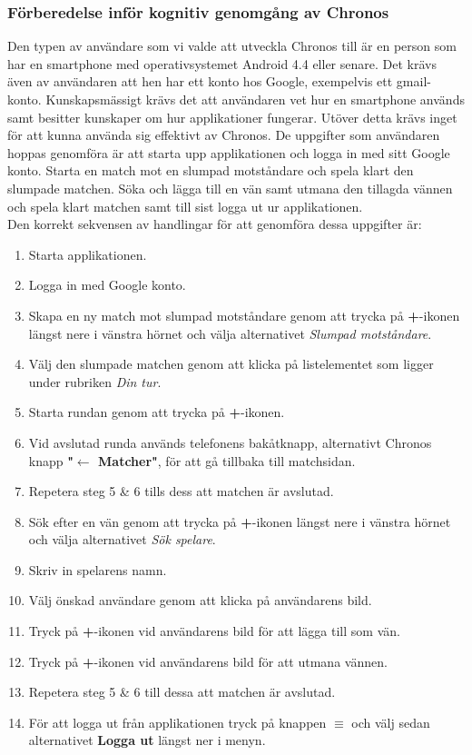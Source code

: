 \documentclass[a4paper, 11pt]{article}
\begin{document}
\subsubsection{Förberedelse inför kognitiv genomgång av Chronos} \label{kog}
Den typen av användare som vi valde att utveckla Chronos till är en person som har en smartphone med operativsystemet Android 4.4 eller senare. Det krävs även av användaren att hen har ett konto hos Google, exempelvis ett gmail-konto. Kunskapsmässigt krävs det att användaren vet hur en smartphone används samt besitter kunskaper om hur applikationer fungerar. Utöver detta krävs inget för att kunna använda sig effektivt av Chronos.
De uppgifter som användaren hoppas genomföra är att starta upp applikationen och logga in med sitt Google konto. Starta en match mot en slumpad motståndare och spela klart den slumpade matchen. Söka och lägga till en vän samt utmana den tillagda vännen och spela klart matchen samt till sist logga ut ur applikationen.\\
Den korrekt sekvensen av handlingar för att genomföra dessa uppgifter är:
\begin{enumerate}
\item Starta applikationen.
\item Logga in med Google konto.
\item Skapa en ny match mot slumpad motståndare genom att trycka på \textbf{+}-ikonen längst nere i vänstra hörnet och välja alternativet \textit{Slumpad motståndare}.
\item Välj den slumpade matchen genom att klicka på listelementet som ligger under rubriken \textit{Din tur}. 
\item Starta rundan genom att trycka på \textbf{+}-ikonen.
\item Vid avslutad runda används telefonens bakåtknapp, alternativt Chronos knapp \textbf{"$\leftarrow$ Matcher"}, för att gå tillbaka till matchsidan.
\item Repetera steg 5 \& 6 tills dess att matchen är avslutad.
\item Sök efter en vän genom att trycka på \textbf{+}-ikonen längst nere i vänstra hörnet och välja alternativet \textit{Sök spelare}.
\item Skriv in spelarens namn.
\item Välj önskad användare genom att klicka på användarens bild.
\item Tryck på \textbf{+}-ikonen vid användarens bild för att lägga till som vän.
\item Tryck på \textbf{+}-ikonen vid användarens bild för att utmana vännen.
\item Repetera steg 5 \& 6 till dessa att matchen är avslutad.
\item För att logga ut från applikationen tryck på knappen \textbf{$\equiv$} och välj sedan alternativet \textbf{Logga ut} längst ner i menyn.
\end{enumerate}
\end{document}
